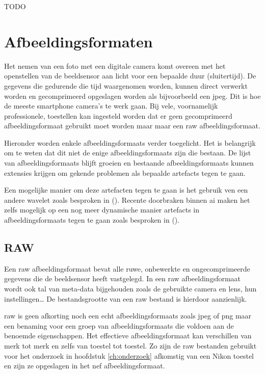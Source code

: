 TODO


\section{Afbeeldingsformaten}
\label{sec:afbeeldingscompressie-afbeeldingsformaten}

Het nemen van een foto met een digitale camera komt overeen met het openstellen van de beeldsensor aan licht voor een bepaalde duur (sluitertijd). De gegevens die gedurende die tijd waargenomen worden, kunnen direct verwerkt worden en gecomprimeerd opgeslagen worden als bijvoorbeeld een \gls{jpeg}. Dit is hoe de meeste smartphone camera’s te werk gaan. Bij vele, voornamelijk professionele, toestellen kan ingesteld worden dat er geen gecomprimeerd \gls{afbeeldingsformaat} gebruikt moet worden maar maar een \gls{raw} \gls{afbeeldingsformaat}. 

Hieronder worden enkele \glspl{afbeeldingsformaat} verder toegelicht. Het is belangrijk om te weten dat dit niet de enige \glspl{afbeeldingsformaat} zijn die bestaan. De lijst van \glspl{afbeeldingsformaat} blijft groeien en bestaande \glspl{afbeeldingsformaat} kunnen extensies krijgen om gekende problemen als bepaalde \glspl{artefact} tegen te gaan. 

Een mogelijke manier om deze artefacten tegen te gaan is het gebruik ven een andere \gls{wavelet} zoals besproken in  (\cite{inproceedings}). Recente doorbraken binnen \gls{ai} maken het zelfs mogelijk op een nog meer dynamische manier \glspl{artefact} in \glspl{afbeeldingsformaat} tegen te gaan zoals besproken in  (\cite{jpegartefactereductionai}).


\subsection{RAW}
\label{sec:afbeeldingscompressie-raw}

Een \gls{raw} \gls{afbeeldingsformaat} bevat alle ruwe, onbewerkte en ongecomprimeerde gegevens die de beeldsensor heeft vastgelegd. In een \gls{raw} \gls{afbeeldingsformaat} wordt ook tal van \gls{meta-data}  bijgehouden zoals de gebruikte camera en lens, hun instellingen… De bestandsgrootte van een \gls{raw} bestand is hierdoor aanzienlijk. 

\Gls{raw} is geen afkorting noch een echt \glspl{afbeeldingsformaat} zoals \gls{jpeg} of \gls{png} maar een benaming voor een groep van \glspl{afbeeldingsformaat} die voldoen aan de benoemde eigenschappen. Het effectieve \gls{afbeeldingsformaat} kan verschillen van merk tot merk en zelfs van toestel tot toestel. Zo zijn de \gls{raw} bestanden gebruikt voor het onderzoek in hoofdstuk \ref{ch:onderzoek} afkomstig van een Nikon toestel en zijn ze opgeslagen in het \gls{nef} \gls{afbeeldingsformaat}.

